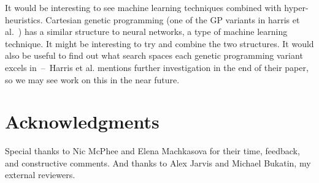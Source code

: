 \documentclass{sig-alternate}
\begin{document}
It would be interesting to see machine learning techniques combined with hyper-heuristics. Cartesian genetic programming (one of the GP variants in harris et al.~\cite{harris:2015}) has a similar structure to neural networks, a type of machine learning technique. It might be interesting to try and combine the two structures. It would also be useful to find out what search spaces each genetic programming variant excels in~--~Harris et al. mentions further investigation in the end of their paper, so we may see work on this in the near future.

\section*{Acknowledgments}
\label{sec:acknowledgments}
Special thanks to Nic McPhee and Elena Machkasova for their time, feedback, and constructive comments. And thanks to Alex Jarvis and Michael Bukatin, my external reviewers.



  
\end{document}
